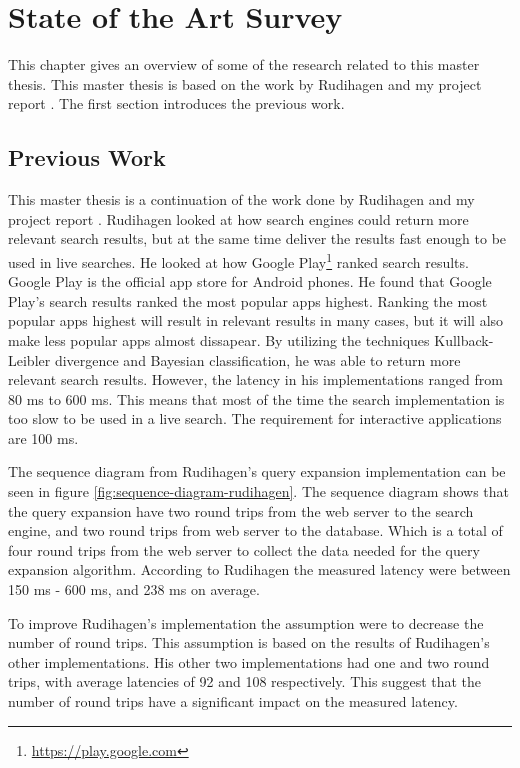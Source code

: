 \chapter{State of the Art Survey}
\label{ch:related-work}
This chapter gives an overview of some of the research related to this master thesis.
This master thesis is based on the work by Rudihagen \cite{master-thesis} and my project report \cite{project-report}.
The first section introduces the previous work.

\section{Previous Work}
\label{sec:previous-work}
This master thesis is a continuation of the work done by Rudihagen \cite{master-thesis} and my project report \cite{project-report}.
Rudihagen looked at how search engines could return more relevant search results,
but at the same time deliver the results fast enough to be used in live searches.
He looked at how Google Play\footnote{\url{https://play.google.com}} ranked search results.
Google Play is the official app store for Android phones.
He found that Google Play's search results ranked the most popular apps highest.
Ranking the most popular apps highest will result in relevant results in many cases,
but it will also make less popular apps almost dissapear.
By utilizing the techniques Kullback-Leibler divergence and Bayesian classification,
he was able to return more relevant search results.
However, the latency in his implementations ranged from 80 ms to 600 ms.
This means that most of the time the search implementation is too slow to be used in a live search.
The requirement for interactive applications are 100 ms.

The sequence diagram from Rudihagen's query expansion implementation can be seen in figure \ref{fig:sequence-diagram-rudihagen}.
The sequence diagram shows that the query expansion have two round trips from the web server to the search engine,
and two round trips from web server to the database.
Which is a total of four round trips from the web server to collect the data needed for the query expansion algorithm.
According to Rudihagen the measured latency were between 150 ms - 600 ms, and 238 ms on average.

To improve Rudihagen's implementation the assumption were to decrease the number of round trips.
This assumption is based on the results of Rudihagen's other implementations.
His other two implementations had one and two round trips,
with average latencies of 92 and 108 respectively.
This suggest that the number of round trips have a significant impact on the measured latency.

